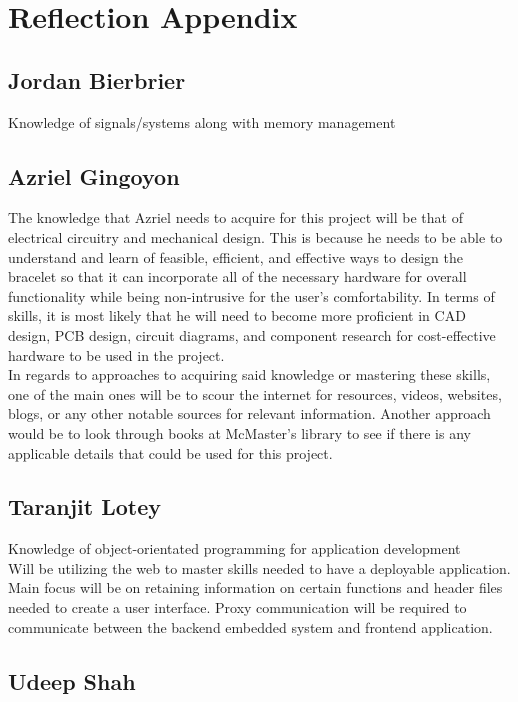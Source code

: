 \documentclass[12pt]{article}
\begin{document}
\section*{Reflection Appendix}

\subsection*{Jordan Bierbrier}
Knowledge of signals/systems along with memory management \\

\subsection*{Azriel Gingoyon}
The knowledge that Azriel needs to acquire for this project will be that of electrical 
circuitry and mechanical design. This is because he needs to be able to understand and 
learn of feasible, efficient, and effective ways to design the bracelet so that it can 
incorporate all of the necessary hardware for overall functionality while being non-intrusive 
for the user's comfortability. In terms of skills, it is most likely that he will need to 
become more proficient in CAD design, PCB design, circuit diagrams, and component research for 
cost-effective hardware to be used in the project.\\
In regards to approaches to acquiring said knowledge or mastering these skills, one of the 
main ones will be to scour the internet for resources, videos, websites, blogs, or any 
other notable sources for relevant information. Another approach would be to look through 
books at McMaster's library to see if there is any applicable details that could be used 
for this project. 

\subsection*{Taranjit Lotey}
Knowledge of object-orientated programming for application development \\
Will be utilizing the web to master skills needed to have a deployable application.
Main focus will be on retaining information on certain functions and header files 
needed to create a user interface. Proxy communication will be required to communicate 
between the backend embedded system and frontend application.\\

\subsection*{Udeep Shah}
\end{document}
